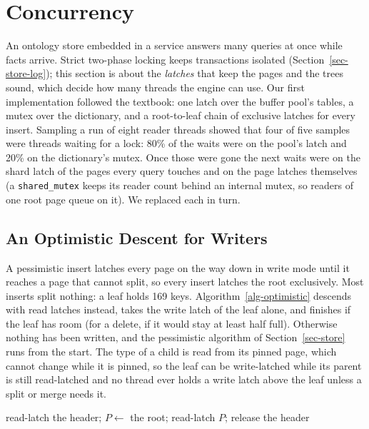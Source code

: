 \section{Concurrency}
\label{sec-conc}

An ontology store embedded in a service answers many queries at once while
facts arrive.
Strict two-phase locking keeps transactions isolated (Section~\ref{sec-store-log});
this section is about the \emph{latches} that keep the pages and the trees
sound, which decide how many threads the engine can use.
Our first implementation followed the textbook: one latch over the buffer
pool's tables, a mutex over the dictionary, and a root-to-leaf chain of
exclusive latches for every insert.
Sampling a run of eight reader threads showed that four of five samples were
threads waiting for a lock: 80\% of the waits were on the pool's latch and
20\% on the dictionary's mutex.
Once those were gone the next waits were on the shard latch of the pages every
query touches and on the page latches themselves (a \texttt{shared\_mutex} keeps
its reader count behind an internal mutex, so readers of one root page queue
on it).
We replaced each in turn.

\subsection{An Optimistic Descent for Writers}

A pessimistic insert latches every page on the way down in write mode until
it reaches a page that cannot split, so every insert latches the root
exclusively.
Most inserts split nothing: a leaf holds 169 keys.
Algorithm~\ref{alg-optimistic} descends with read latches instead, takes the
write latch of the leaf alone, and finishes if the leaf has room (for a
delete, if it would stay at least half full).
Otherwise nothing has been written, and the pessimistic algorithm of
Section~\ref{sec-store} runs from the start.
The type of a child is read from its pinned page, which cannot change while it
is pinned, so the leaf can be write-latched while its parent is still
read-latched and no thread ever holds a write latch above the leaf unless a
split or merge needs it.

\begin{algorithm}[t]
\caption{\textsc{TryLeafOnly}$(x,\mathit{op})$ for an insert or a delete}\label{alg-optimistic}
\small
read-latch the header; $P \gets$ the root; 
read-latch $P$; release the header\;
\end{algorithm}


